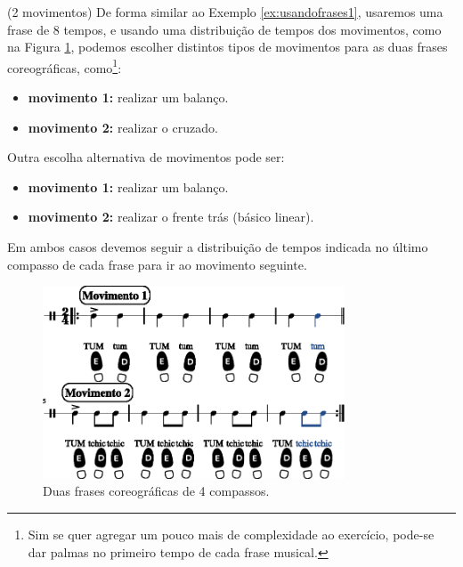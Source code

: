 \begin{example}(2 movimentos)
De forma similar ao Exemplo \ref{ex:usandofrases1},
usaremos uma frase de 8 tempos, 
e usando uma distribuição de tempos dos movimentos, como na Figura \ref{fig:frasecoreografica1a}, 
podemos escolher distintos tipos de movimentos para as duas  frases coreográficas, 
como\footnote{Sim 
se quer agregar um pouco mais de complexidade ao exercício,
pode-se dar palmas no primeiro tempo de cada frase musical.}:
\begin{itemize}
\item \textbf{movimento 1:} realizar um balanço.
\item \textbf{movimento 2:} realizar o cruzado.
\end{itemize}
Outra  escolha alternativa de movimentos pode ser:
\begin{itemize}
\item \textbf{movimento 1:} realizar um balanço.
\item \textbf{movimento 2:} realizar o frente trás (básico linear).
\end{itemize}
Em ambos casos devemos seguir a distribuição de tempos indicada no último compasso de cada frase 
para ir ao movimento seguinte.
\end{example}

\begin{figure}[!h]
    \centering
    \includegraphics[width=0.8\textwidth]{chapters/cap-musicalidade/treino-fraseio1a-1.eps}
    \caption{Duas frases coreográficas de 4 compassos.}
    \label{fig:frasecoreografica1a}
\end{figure}


